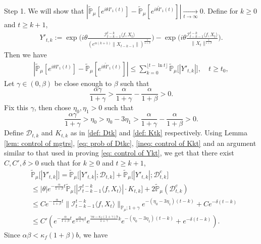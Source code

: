 \documentclass[12pt]{amsart}
\theoremstyle{plain}
\theoremstyle{definition}
\numberwithin{equation}{section}
\begin{document}
    Step 1. We will show that $|\mathbb{\tilde{P}}_{\mu}[e^{i\theta I'_1(t)}]-\mathbb{\tilde{P}}_{\mu}[e^{i\theta\tilde I'_1(t)}]|\xrightarrow[t\to \infty]{} 0$.
    Define for $k\geq 0$ and $t\geq k+1$,
\begin{align*}
    Y'_{t,k}
    :=\exp\Big(i\theta\frac{\mathcal I_{t-k-1}^{t-k}\langle f ,X_t\rangle}{( e^{\alpha(k+1)}\|X_{t-k-1}\|)^{\frac{1}{1+\beta}}}\Big)-\exp\Big(i\theta\frac{\mathcal I_{t-k-1}^{t-k}\langle f ,X_t\rangle}{\|X_t\|^{\frac{1}{1+\beta}}}\Big).
\end{align*}
	Then we have 
\begin{align}
\label{ineq: control of I1tb}
    |\mathbb{\tilde{P}}_{\mu}[e^{i\theta I'_1(t)}] - \mathbb{\tilde{P}}_{\mu} [e^{i\theta\tilde{I}'_1(t)}]|
    \leq \sum_{k=0}^{\lfloor t-\ln t \rfloor}\mathbb{\tilde{P}}_{\mu}\big[|Y'_{t,k}|\big],
    \quad t\geq t_0,
\end{align}
    Let $\gamma \in (0,\beta)$ be close enough to $\beta$ such that
\[
    \frac{\alpha \gamma}{1+\gamma} > \frac{\alpha}{1+\gamma} - \frac{\alpha}{1+\beta} > 0.
\]
    Fix this $\gamma$, then chose $\eta_0,\eta_1>0$ such that
\[
    \frac{\alpha \gamma}{1+\gamma} >\eta_0 > \eta_0 - 3\eta_1 > \frac{\alpha}{1+\gamma} - \frac{\alpha}{1+\beta} > 0.
\]
	Define $\mathcal D_{t,k}$ and $K_{t,k}$ as in \eqref{def: Dtk} and \eqref{def: Ktk} respectively.
	Using Lemma \ref{lem: control of mgtrs}, \eqref{eq: prob of Dtkc}, \eqref{ineq: control of Kkt} and an argument similar to that used in proving \eqref{eq: control of Ykt}, we get that there exist $C,C',\delta>0$ such that for $k\geq 0$ and $t\geq k+1$,
\begin{align*}
    &\mathbb{\tilde{P}}_{\mu}\big[|Y'_{t,k}|\big]
    = \mathbb{\tilde{P}}_{\mu}\big[|Y'_{t,k}|; \mathcal D_{t,k}\big] + \mathbb{\tilde{P}}_{\mu}\big[|Y'_{t,k}|; \mathcal D_{t,k}^c \big]
    \\& \leq |\theta| e^{-\frac{\alpha}{1+\beta} t}\mathbb{\tilde{P}}_{\mu}\big[|\mathcal I_{t-k-1}^{t-k}\langle f ,X_t\rangle|\cdot K_{t,k}\big] + 2\mathbb{\tilde{P}}_{\mu}( \mathcal D_{t,k}^c )
    \\& \leq C e^{-\frac{\alpha}{1+\beta} t} \|\mathcal I_{t-k-1}^{t-k}\langle f, X_t\rangle \|_{\mathbb P_\mu; 1+\gamma}e^{-(\eta_0 - 3\eta_1)(t-k)} + Ce^{-\delta(t-k)}
    \\& \leq C'( e^{-\frac{\alpha}{1+\beta}t}e^{\frac{\alpha}{1+\gamma}t}e^{\frac{\gamma \alpha-\kappa_f(1+\gamma)b}{1+\gamma}k}e^{-(\eta_0 - 3\eta_1)(t-k)}+ e^{-\delta(t-k)}).
\end{align*}
Since $\alpha\beta<\kappa_f(1+\beta)b$,  we have  
\end{document}
